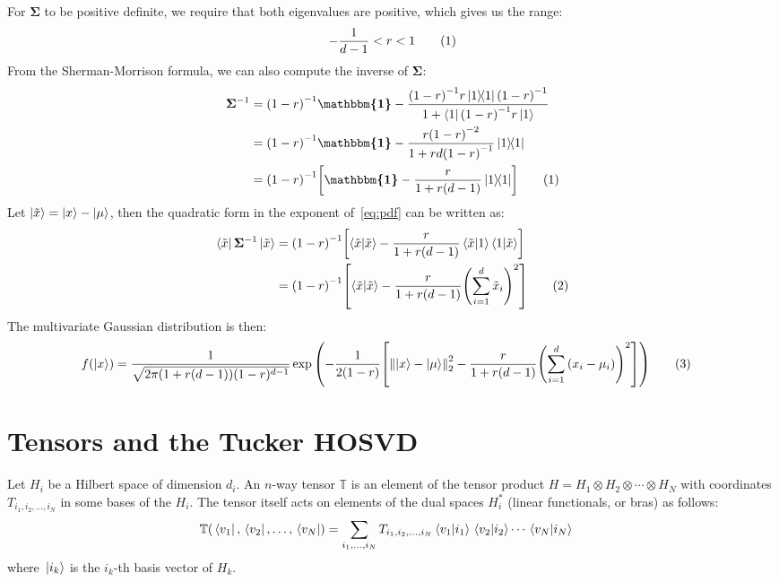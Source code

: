 \documentclass[12pt]{article}
\numberwithin{theorem}{section}
\numberwithin{equation}{section}
\numberwithin{figure}{section}
\begin{document}
For \(\bm{\Sigma}\) to be positive definite, we require that both eigenvalues are positive, which gives us the range:
\begin{align*}
    -\frac{1}{d - 1} < r < 1\stepcounter{equation}\tag{\theequation}\label{eq:range}
\end{align*}
From the Sherman-Morrison formula, we can also compute the inverse of \(\bm{\Sigma}\):
\begin{align*}
    \bm{\Sigma}^{-1} &= \qty(1-r)^{-1}\bm{\mathbbm{1}} - \frac{\qty(1-r)^{-1}r\op{1}\qty(1-r)^{-1}}{1 + \bra{1}\qty(1-r)^{-1}r\ket{1}} \\
                     &= \qty(1-r)^{-1}\bm{\mathbbm{1}} - \frac{r\qty(1-r)^{-2}}{1 + rd\qty(1-r)^{-1}}\op{1}\\
                     &= \qty(1-r)^{-1}\qty[\bm{\mathbbm{1}} - \frac{r}{1 + r\qty(d - 1)}\op{1}]\stepcounter{equation}\tag{\theequation}\label{eq:inv}
\end{align*}
Let \(\ket{\tilde{x}} = \ket{x} - \ket{\mu}\), then the quadratic form in the exponent of~\cref{eq:pdf} can be written as:
\begin{align*}
    \bra{\tilde{x}}\bm{\Sigma}^{-1}\ket{\tilde{x}} &= \qty(1-r)^{-1}\qty[\bra{\tilde{x}}\ket{\tilde{x}} - \frac{r}{1 + r\qty(d - 1)}\bra{\tilde{x}}\ket{1}\bra{1}\ket{\tilde{x}}] \\
                                                           &= \qty(1-r)^{-1}\qty[\bra{\tilde{x}}\ket{\tilde{x}} - \frac{r}{1 + r\qty(d - 1)}\qty(\sum_{i=1}^{d}\tilde{x}_i)^2]\stepcounter{equation}\tag{\theequation}\label{eq:quad}
\end{align*}
The multivariate Gaussian distribution is then:
\begin{align*}
    f\qty(\ket{x}) &= \frac{1}{\sqrt{2\pi(1 + r\qty(d-1))(1 - r)^{d - 1}}} \exp\qty(-\frac{1}{2(1-r)}\qty[\norm{\ket{x} - \ket{\mu}}_2^2 - \frac{r}{1 + r\qty(d - 1)}\qty(\sum_{i=1}^{d}\qty(x_i - \mu_i))^2])\stepcounter{equation}\tag{\theequation}\label{eq:pdf-simple}
\end{align*}

\section{Tensors and the Tucker HOSVD}

Let \(H_i\) be a Hilbert space of dimension \(d_i\). An \(n\)-way tensor
\(\mathbb{T}\) is an element of the tensor product \(H = H_1 \otimes H_2 \otimes
\cdots \otimes H_N\) with coordinates \(T_{i_1, i_2,\ldots, i_N}\) in some bases
of the \(H_i\). The tensor itself acts on elements of the dual spaces
\(H_i^{*}\) (linear functionals, or bras) as follows:
\begin{align*}
    \mathbb{T}\qty(\bra*{v_1}, \bra*{v_2}, \ldots, \bra*{v_N}) &= \sum_{i_1, \ldots, i_N} T_{i_1, i_2,\ldots, i_N} \bra*{v_1}\ket*{i_1} \bra*{v_2}\ket*{i_2} \cdots \bra*{v_N}\ket*{i_N}
\end{align*}
where \(\ket*{i_k}\) is the \(i_k\)-th basis vector of \(H_k\).
\end{document}
